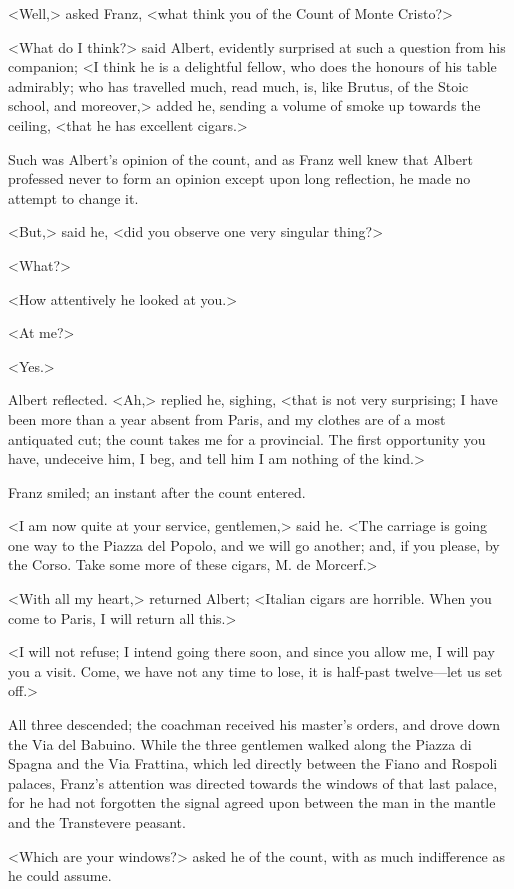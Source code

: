  <Well,> asked Franz, <what think you of the Count of Monte Cristo?> 

 <What do I think?> said Albert, evidently surprised at such a question from his companion; <I think he is a delightful fellow, who does the honours of his table admirably; who has travelled much, read much, is, like Brutus, of the Stoic school, and moreover,> added he, sending a volume of smoke up towards the ceiling, <that he has excellent cigars.> 

 Such was Albert's opinion of the count, and as Franz well knew that Albert professed never to form an opinion except upon long reflection, he made no attempt to change it. 

 <But,> said he, <did you observe one very singular thing?> 

 <What?> 

 <How attentively he looked at you.> 

 <At me?> 

 <Yes.> 

 Albert reflected. <Ah,> replied he, sighing, <that is not very surprising; I have been more than a year absent from Paris, and my clothes are of a most antiquated cut; the count takes me for a provincial. The first opportunity you have, undeceive him, I beg, and tell him I am nothing of the kind.> 

 Franz smiled; an instant after the count entered. 

 <I am now quite at your service, gentlemen,> said he. <The carriage is going one way to the Piazza del Popolo, and we will go another; and, if you please, by the Corso. Take some more of these cigars, M. de Morcerf.> 

 <With all my heart,> returned Albert; <Italian cigars are horrible. When you come to Paris, I will return all this.> 

 <I will not refuse; I intend going there soon, and since you allow me, I will pay you a visit. Come, we have not any time to lose, it is half-past twelve—let us set off.> 

 All three descended; the coachman received his master's orders, and drove down the Via del Babuino. While the three gentlemen walked along the Piazza di Spagna and the Via Frattina, which led directly between the Fiano and Rospoli palaces, Franz's attention was directed towards the windows of that last palace, for he had not forgotten the signal agreed upon between the man in the mantle and the Transtevere peasant. 

 <Which are your windows?> asked he of the count, with as much indifference as he could assume. 


